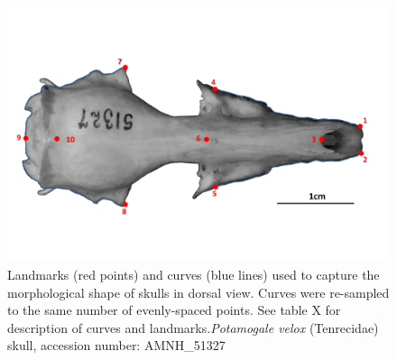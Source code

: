 \documentclass[12pt,a4paper]{article}
\begin{document}
\begin{figure}[H]
\centering
\includegraphics[width=1\linewidth]{AMNH_51327_dorsallandmarksdiagram.png}
\caption{Landmarks (red points) and curves (blue lines) used to capture the morphological shape of skulls in dorsal view. Curves were re-sampled to the same number of evenly-spaced points. See table X for description of curves and landmarks.\textit{Potamogale velox} (Tenrecidae) skull, accession number: AMNH\_51327}
\label{dorslandmarks}
\end{figure}


\end{document}
